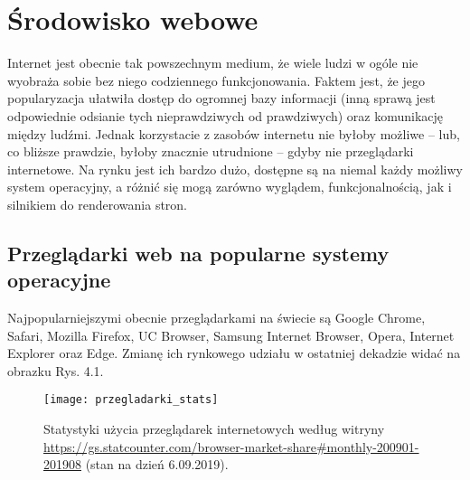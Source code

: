 \section{Środowisko webowe}

Internet jest obecnie tak powszechnym medium, że wiele ludzi w ogóle nie wyobraża sobie bez niego codziennego funkcjonowania. Faktem jest, że jego popularyzacja ułatwiła dostęp do ogromnej bazy informacji (inną sprawą jest odpowiednie odsianie tych nieprawdziwych od prawdziwych) oraz komunikację między ludźmi. Jednak korzystacie z zasobów internetu nie byłoby możliwe – lub, co bliższe prawdzie, byłoby znacznie utrudnione – gdyby nie przeglądarki internetowe. Na rynku jest ich bardzo dużo, dostępne są na niemal każdy możliwy system operacyjny, a różnić się mogą zarówno wyglądem, funkcjonalnością, jak i silnikiem do renderowania stron. \newline

\subsection{Przeglądarki web na popularne systemy operacyjne}

Najpopularniejszymi obecnie przeglądarkami na świecie są Google Chrome, Safari, Mozilla Firefox, UC Browser, Samsung Internet Browser, Opera, Internet Explorer oraz Edge. Zmianę ich rynkowego udziału w ostatniej dekadzie widać na obrazku Rys. 4.1.

\begin{figure}[H]
\centering
\texttt{[image: przegladarki\_stats]}
\caption{Statystyki użycia przeglądarek internetowych według witryny \protect\url{https://gs.statcounter.com/browser-market-share\#monthly-200901-201908} (stan na dzień 6.09.2019).}
\end{figure}

